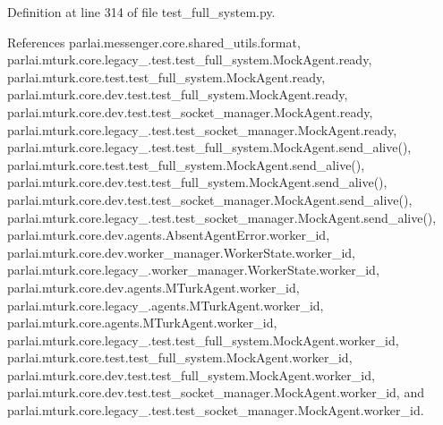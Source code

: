 Definition at line 314 of file test\+\_\+full\+\_\+system.\+py.



References parlai.\+messenger.\+core.\+shared\+\_\+utils.\+format, parlai.\+mturk.\+core.\+legacy\+\_.\+test.\+test\+\_\+full\+\_\+system.\+Mock\+Agent.\+ready, parlai.\+mturk.\+core.\+test.\+test\+\_\+full\+\_\+system.\+Mock\+Agent.\+ready, parlai.\+mturk.\+core.\+dev.\+test.\+test\+\_\+full\+\_\+system.\+Mock\+Agent.\+ready, parlai.\+mturk.\+core.\+dev.\+test.\+test\+\_\+socket\+\_\+manager.\+Mock\+Agent.\+ready, parlai.\+mturk.\+core.\+legacy\+\_.\+test.\+test\+\_\+socket\+\_\+manager.\+Mock\+Agent.\+ready, parlai.\+mturk.\+core.\+legacy\+\_.\+test.\+test\+\_\+full\+\_\+system.\+Mock\+Agent.\+send\+\_\+alive(), parlai.\+mturk.\+core.\+test.\+test\+\_\+full\+\_\+system.\+Mock\+Agent.\+send\+\_\+alive(), parlai.\+mturk.\+core.\+dev.\+test.\+test\+\_\+full\+\_\+system.\+Mock\+Agent.\+send\+\_\+alive(), parlai.\+mturk.\+core.\+dev.\+test.\+test\+\_\+socket\+\_\+manager.\+Mock\+Agent.\+send\+\_\+alive(), parlai.\+mturk.\+core.\+legacy\+\_.\+test.\+test\+\_\+socket\+\_\+manager.\+Mock\+Agent.\+send\+\_\+alive(), parlai.\+mturk.\+core.\+dev.\+agents.\+Absent\+Agent\+Error.\+worker\+\_\+id, parlai.\+mturk.\+core.\+dev.\+worker\+\_\+manager.\+Worker\+State.\+worker\+\_\+id, parlai.\+mturk.\+core.\+legacy\+\_.\+worker\+\_\+manager.\+Worker\+State.\+worker\+\_\+id, parlai.\+mturk.\+core.\+dev.\+agents.\+M\+Turk\+Agent.\+worker\+\_\+id, parlai.\+mturk.\+core.\+legacy\+\_.\+agents.\+M\+Turk\+Agent.\+worker\+\_\+id, parlai.\+mturk.\+core.\+agents.\+M\+Turk\+Agent.\+worker\+\_\+id, parlai.\+mturk.\+core.\+legacy\+\_.\+test.\+test\+\_\+full\+\_\+system.\+Mock\+Agent.\+worker\+\_\+id, parlai.\+mturk.\+core.\+test.\+test\+\_\+full\+\_\+system.\+Mock\+Agent.\+worker\+\_\+id, parlai.\+mturk.\+core.\+dev.\+test.\+test\+\_\+full\+\_\+system.\+Mock\+Agent.\+worker\+\_\+id, parlai.\+mturk.\+core.\+dev.\+test.\+test\+\_\+socket\+\_\+manager.\+Mock\+Agent.\+worker\+\_\+id, and parlai.\+mturk.\+core.\+legacy\+\_.\+test.\+test\+\_\+socket\+\_\+manager.\+Mock\+Agent.\+worker\+\_\+id.

